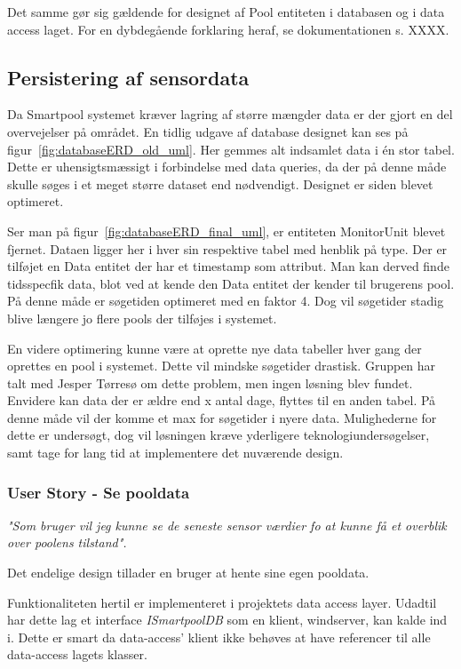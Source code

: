 Det samme gør sig gældende for designet af Pool entiteten i databasen og i data access laget. For en dybdegående forklaring heraf, se dokumentationen s. XXXX.

\subsection{Persistering af sensordata}
Da Smartpool systemet kræver lagring af større mængder data er der gjort en del overvejelser på området. 
En tidlig udgave af database designet kan ses på figur~\ref{fig:databaseERD_old_uml}. Her gemmes alt indsamlet data i én stor tabel. Dette er uhensigtsmæssigt i forbindelse med data queries, da der på denne måde skulle søges i et meget større dataset end nødvendigt. Designet er siden blevet optimeret. 

Ser man på figur~\ref{fig:databaseERD_final_uml}, er entiteten MonitorUnit blevet fjernet. Dataen ligger her i hver sin respektive tabel med henblik på type. Der er tilføjet en Data entitet der har et timestamp som attribut. Man kan derved finde tidsspecfik data, blot ved at kende den Data entitet der kender til brugerens pool. På denne måde er søgetiden optimeret med en faktor 4. Dog vil søgetider stadig blive længere jo flere pools der tilføjes i systemet.

En videre optimering kunne være at oprette nye data tabeller hver gang der oprettes en pool i systemet. Dette vil mindske søgetider drastisk. Gruppen har talt med Jesper Tørresø om dette problem, men ingen løsning blev fundet.
Envidere kan data der er ældre end x antal dage, flyttes til en anden tabel. På denne måde vil der komme et max for søgetider i nyere data.
Mulighederne for dette er undersøgt, dog vil løsningen kræve yderligere teknologiundersøgelser, samt tage for lang tid at implementere det nuværende design.

\subsubsection{User Story - Se pooldata}

\textit{"Som bruger vil jeg kunne se de seneste sensor værdier fo at kunne få et overblik over poolens tilstand".}

Det endelige design tillader en bruger at hente sine egen pooldata.

Funktionaliteten hertil er implementeret i projektets data access layer. Udadtil har dette lag et interface \textit{ISmartpoolDB} som en klient, \gls{windserver}, kan kalde ind i. Dette er smart da data-access' klient ikke behøves at have referencer til alle data-access lagets klasser.

